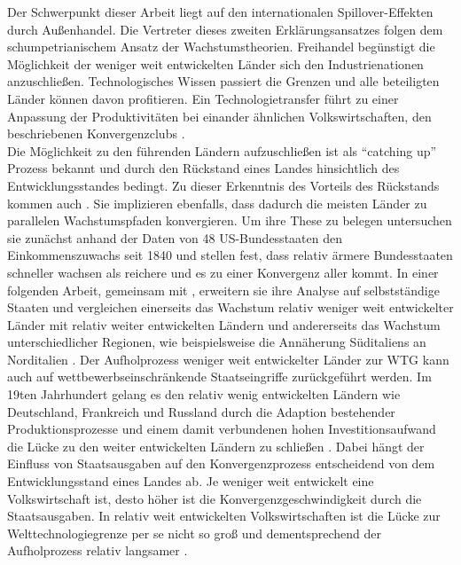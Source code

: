 Der Schwerpunkt dieser Arbeit liegt auf den internationalen Spillover-Effekten durch Au{\ss}enhandel.
Die Vertreter dieses zweiten Erkl{\"a}rungsansatzes folgen dem schumpetrianischem Ansatz der Wachstumstheorien. Freihandel beg{\"u}nstigt die M{\"o}glichkeit der weniger weit entwickelten L{\"a}nder sich den Industrienationen anzuschlie{\ss}en. Technologisches Wissen passiert die Grenzen und alle beteiligten L{\"a}nder k{\"o}nnen davon profitieren. 
Ein Technologietransfer f{\"u}hrt zu einer Anpassung der Produktivit{\"a}ten bei einander {\"a}hnlichen Volkswirtschaften, den beschriebenen Konvergenzclubs \citep{Durlauf.1995, Quah.1993,Quah.1997}.\\
Die M{\"o}glichkeit zu den f{\"u}hrenden L{\"a}ndern aufzuschlie{\ss}en ist als "`catching up"' Prozess bekannt und durch den R{\"u}ckstand eines Landes hinsichtlich des Entwicklungsstandes bedingt. Zu dieser Erkenntnis des Vorteils des R{\"u}ckstands kommen auch \citet{Barro.1990,Barro.1991,Barro.1992}. Sie implizieren ebenfalls, dass dadurch die meisten L{\"a}nder zu parallelen Wachstumspfaden konvergieren. Um ihre These zu belegen untersuchen sie zun{\"a}chst anhand der Daten von 48 US-Bundesstaaten den Einkommenszuwachs seit 1840 und stellen fest, dass relativ {\"a}rmere Bundesstaaten schneller wachsen als reichere und es zu einer Konvergenz aller kommt. In einer folgenden Arbeit, gemeinsam mit \citet{Blanchard.1989}, erweitern sie ihre Analyse auf selbstst{\"a}ndige Staaten und vergleichen einerseits das Wachstum relativ weniger weit entwickelter L{\"a}nder mit relativ weiter entwickelten L{\"a}ndern und andererseits das Wachstum unterschiedlicher Regionen, wie beispielsweise die Ann{\"a}herung S{\"u}ditaliens an Norditalien \citep{Barro.1992}.\newline
Der Aufholprozess weniger weit entwickelter L{\"a}nder zur WTG kann auch auf wettbewerbseinschr{\"a}nkende Staatseingriffe zur{\"u}ckgef{\"u}hrt werden. Im 19ten Jahrhundert gelang es den relativ wenig entwickelten L{\"a}ndern wie Deutschland, Frankreich und Russland durch die Adaption bestehender Produktionsprozesse und einem damit verbundenen hohen Investitionsaufwand die L{\"u}cke zu den weiter entwickelten L{\"a}ndern zu schlie{\ss}en \citep{Gerschenkron.1962}. Dabei h{\"a}ngt der Einfluss von Staatsausgaben auf den Konvergenzprozess entscheidend von dem Entwicklungsstand eines Landes ab. Je weniger weit entwickelt eine Volkswirtschaft ist, desto h{\"o}her ist die Konvergenzgeschwindigkeit durch die Staatsausgaben. In relativ weit entwickelten Volkswirtschaften ist die L{\"u}cke zur Welttechnologiegrenze per se nicht so gro{\ss} und dementsprechend der Aufholprozess relativ langsamer \citep{Ott.2011}. 
